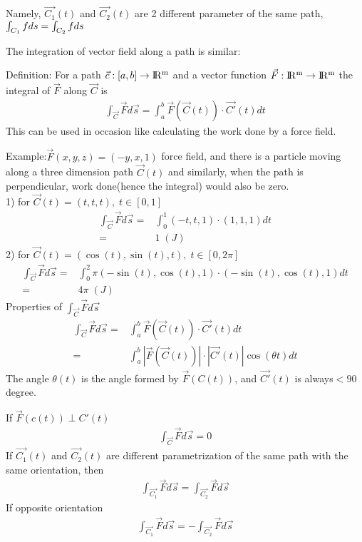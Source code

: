 \documentclass{article}
\newcommand{\R}{\rm I\!R}
\begin{document}
        Namely, $\vec{C_1}(t)$ and $\vec{C_2}(t)$ are 2 different parameter of the same path, $\int_{C_1} fds = \int_{C_2} fds\\$
        
        The integration of vector field along a path is similar:
        
        Definition: For a path $\vec{c}:[a,b]\rightarrow \R^m$ and a vector function $\vec{F}:\R^m\rightarrow\R^m$ the integral of $\vec{F}$ along $\vec{C}$ is
        \begin{align}
            \int_{\vec{C}}\vec{F}d\vec{s} = \int_a^b \vec{F}(\vec{C}(t))\cdot\vec{C'}(t)dt
        \end{align}
        This can be used in occasion like calculating the work done by a force field.
        
        Example:$\vec{F}(x,y,z) = (-y,x,1)$ force field, and there is a particle moving along a three dimension path $\vec{C}(t)$ and similarly, when the path is perpendicular, work done(hence the integral) would also be zero.\\
        
        1) for $\vec{C}(t) = (t,t,t),\;t\in[0,1]$
        \begin{align}
            \int_{\vec{C}}\vec{F}d\vec{s} =& \int_0^1(-t,t,1)\cdot(1,1,1)dt\\
            =&1\;(J)
        \end{align}
        2) for $\vec{C}(t) = (\cos(t),\sin(t),t),\;t\in[0,2\pi]$
        \begin{align}
            \int_{\vec{C}}\vec{F}d\vec{s} =& \int_0^2\pi(-\sin(t),\cos(t),1)\cdot(-\sin(t),\cos(t),1)dt\\
            =&4\pi\;(J)
        \end{align}
        Properties of $\int_{\vec{C}}\vec{F}d\vec{s}$
        \begin{align}
            \int_{\vec{C}}\vec{F}d\vec{s} =& \int_a^b \vec{F}(\vec{C}(t))\cdot\vec{C'}(t)dt\\
            =& \int_a^b |\vec{F}(\vec{C}(t))|\cdot|\vec{C'}(t)|\cos(\theta t)dt
        \end{align}
        The angle $\theta(t)$ is the angle formed by $\vec{F}(C(t))$, and $\vec{C'}(t)$ is always$< 90$ degree.
        
        If $\vec{F}(c(t)) \perp C'(t)$
        \begin{align}
             \int_{\vec{C}}\vec{F}d\vec{s} = 0
        \end{align}
        If $\vec{C_1}(t)$ and $\vec{C_2}(t)$ are different parametrization of the same path with the same orientation, then
        \begin{align}
            \int_{\vec{C_1}}\vec{F}d\vec{s} = \int_{\vec{C_2}}\vec{F}d\vec{s}
        \end{align}
        If opposite orientation
        \begin{align}
            \int_{\vec{C_1}}\vec{F}d\vec{s} = -\int_{\vec{C_2}}\vec{F}d\vec{s}
        \end{align}
        
        
\end{document}
